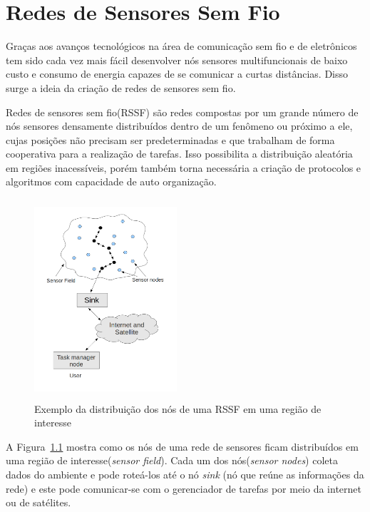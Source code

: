 \chapter{Redes de Sensores Sem Fio}

Graças aos avanços tecnológicos na área de comunicação sem fio e de eletrônicos tem sido cada vez mais fácil desenvolver nós sensores multifuncionais de baixo custo e consumo de energia capazes de se comunicar a curtas distâncias. Disso surge a ideia da criação de redes de sensores sem fio.

Redes de sensores sem fio(RSSF) são redes compostas por um grande número de nós sensores densamente distribuídos dentro de um fenômeno ou próximo a ele, cujas posições não precisam ser predeterminadas e que trabalham de forma cooperativa para a realização de tarefas. Isso possibilita a distribuição aleatória em regiões inacessíveis, porém também torna necessária a criação de protocolos e algoritmos com capacidade de auto organização\cite{Akyildiz2002}.

\begin{figure}[!htb]
\centering
\includegraphics[width=200px,height=280px]{./Pictures/SensorNodesScatteredInASensorField.png}
\caption{Exemplo da distribuição dos nós de uma RSSF em uma região de interesse} %
\label{fig:snsf} %
\end{figure}

A Figura~\ref{fig:snsf} mostra como os nós de uma rede de sensores ficam distribuídos em uma região de interesse(\textit{sensor field}). Cada um dos nós(\textit{sensor nodes}) coleta dados do ambiente e pode roteá-los até o nó \textit{sink} (nó que reúne as informações da rede) e este pode comunicar-se com o gerenciador de tarefas por meio da internet ou de satélites.

